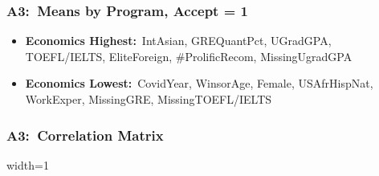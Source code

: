 \documentclass[12pt, aspectratio=169]{beamer}
\begin{document}
\begin{frame}[label=mbppa1]
\frametitle{A3:\ Means by Program, Accept = 1}
\addtocounter{framenumber}{-1}
\centering
\addtocounter{table}{-1}
\renewcommand{\thetable}{\arabic{table}b}
\vspace{-7.5pt}
\begin{minipage}[t]{0.55\textwidth}
\end{minipage}%
\hfill
\begin{minipage}[c][0.8\textheight][c]{0.45\textwidth}
\begin{itemize}
\item \textbf{Economics Highest:}\ IntAsian, GREQuantPct, UGradGPA, TOEFL/IELTS, EliteForeign, \#ProlificRecom, MissingUgradGPA\!
\item \textbf{Economics Lowest:}\ CovidYear, WinsorAge, Female, USAfrHispNat, WorkExper, MissingGRE, MissingTOEFL/IELTS\!\!\!
\end{itemize}
\end{minipage}
\raggedright
\hyperlink{rfs}{}
\end{frame}

\begin{frame}[label=cm]
\frametitle{A3:\ Correlation Matrix}
\begin{table}[htbp]
\begin{center}
\caption{Correlation Matrix}
\vspace{5pt}
\begin{adjustbox}{width=1\textwidth}
\resizebox*{\dimexpr\textwidth-0\baselineskip\relax}{!}{
}
\end{adjustbox}
\end{center}
\end{table}
\hyperlink{rfs}{}
\end{frame}
\end{document}
